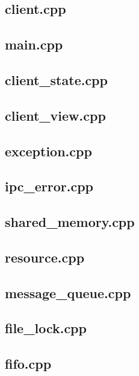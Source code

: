 \subsection*{client.cpp}
\scriptsize
\subsection*{main.cpp}
\scriptsize
\subsection*{client_state.cpp}
\scriptsize
\subsection*{client_view.cpp}
\scriptsize
\subsection*{exception.cpp}
\scriptsize
\subsection*{ipc_error.cpp}
\scriptsize
\subsection*{shared_memory.cpp}
\scriptsize
\subsection*{resource.cpp}
\scriptsize
\subsection*{message_queue.cpp}
\scriptsize
\subsection*{file_lock.cpp}
\scriptsize
\subsection*{fifo.cpp}
\scriptsize
